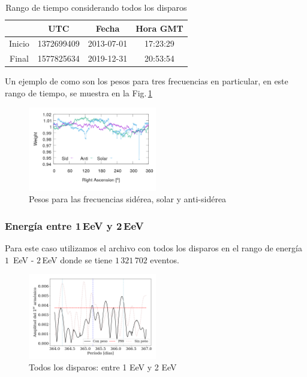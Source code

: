 	\begin{table}[H]
	\centering
		\begin{tabular}{c|c|c|c}
	 		& UTC 			& Fecha		 	&  Hora GMT  \\ \hline
	Inicio	& 1372699409	&2013-07-01 	&17:23:29		\\
	Final 	& 1577825634	&2019-12-31 	&20:53:54		\\
		\end{tabular}
	\caption{Rango de tiempo considerando todos los disparos} 	\label{rango_corto}
	\end{table}


Un ejemplo de como son los pesos para tres frecuencias en particular, en este rango de tiempo, se muestra en la Fig.\,\ref{fig:pesos}


\begin{figure}[H]
	\centering
	\includegraphics[width=0.5\textwidth]{pesos_side_sola_anti.png}
	\caption{Pesos para las frecuencias sidérea, solar y anti-sidérea}
	\label{fig:pesos}
\end{figure}


\subsubsection{Energía entre 1\,EeV y 2\,EeV}

Para este caso utilizamos el archivo con todos los disparos en el rango de energía $1\,$ EeV - $2\,$EeV donde se tiene $1\,321\,702$ eventos.

\begin{figure}[H]
	\centering
	\includegraphics[width=0.5\textwidth]{2019_AllTriggers_1_2_EeV_con_vs_sin_peso.png}
	\caption{Todos los disparos: entre 1 EeV y 2 EeV}
	\label{fig:12w}
\end{figure}

